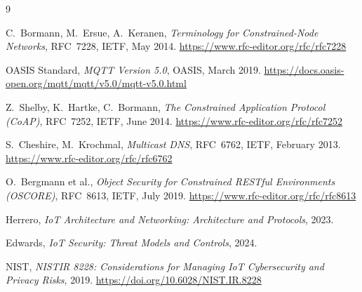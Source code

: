 \documentclass[12pt,a4paper]{article}
\begin{document}
\begin{thebibliography}{9}

C.\ Bormann, M.\ Ersue, A.\ Keranen,
\textit{Terminology for Constrained-Node Networks},
RFC~7228, IETF, May 2014.
\url{https://www.rfc-editor.org/rfc/rfc7228}

OASIS Standard,
\textit{MQTT Version 5.0},
OASIS, March 2019.
\url{https://docs.oasis-open.org/mqtt/mqtt/v5.0/mqtt-v5.0.html}

Z.\ Shelby, K.\ Hartke, C.\ Bormann,
\textit{The Constrained Application Protocol (CoAP)},
RFC~7252, IETF, June 2014.
\url{https://www.rfc-editor.org/rfc/rfc7252}

S.\ Cheshire, M.\ Krochmal,
\textit{Multicast DNS},
RFC~6762, IETF, February 2013.
\url{https://www.rfc-editor.org/rfc/rfc6762}

O.\ Bergmann et al.,
\textit{Object Security for Constrained RESTful Environments (OSCORE)},
RFC~8613, IETF, July 2019.
\url{https://www.rfc-editor.org/rfc/rfc8613}

Herrero,
\textit{IoT Architecture and Networking: Architecture and Protocols}, 2023.

Edwards,
\textit{IoT Security: Threat Models and Controls}, 2024.

NIST,
\textit{NISTIR 8228: Considerations for Managing IoT Cybersecurity and Privacy Risks}, 2019.
\url{https://doi.org/10.6028/NIST.IR.8228}

\end{thebibliography}
\end{document}
